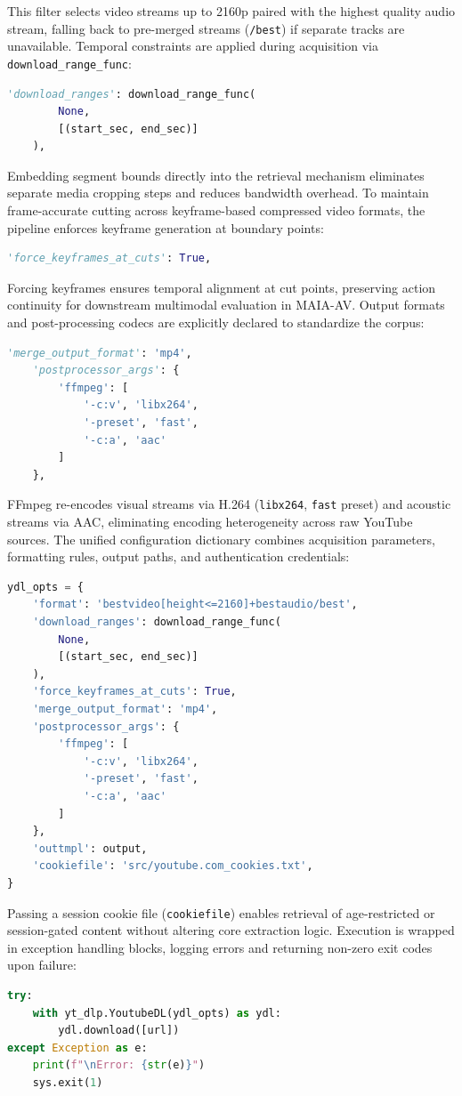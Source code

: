 This filter selects video streams up to 2160p paired with the highest quality audio stream, falling back to pre-merged streams (\texttt{/best}) if separate tracks are unavailable.
Temporal constraints are applied during acquisition via \texttt{download\_range\_func}:
\begin{lstlisting}[language=Python, xleftmargin=2em]
    'download_ranges': download_range_func(
        None,
        [(start_sec, end_sec)]
    ),
\end{lstlisting}
Embedding segment bounds directly into the retrieval mechanism eliminates separate media cropping steps and reduces bandwidth overhead.
To maintain frame-accurate cutting across keyframe-based compressed video formats, the pipeline enforces keyframe generation at boundary points:
\begin{lstlisting}[language=Python, xleftmargin=2em]
    'force_keyframes_at_cuts': True,
\end{lstlisting}
Forcing keyframes ensures temporal alignment at cut points, preserving action continuity for downstream multimodal evaluation in MAIA-AV.
Output formats and post-processing codecs are explicitly declared to standardize the corpus:
\begin{lstlisting}[language=Python, xleftmargin=2em]
    'merge_output_format': 'mp4',
    'postprocessor_args': {
        'ffmpeg': [
            '-c:v', 'libx264',
            '-preset', 'fast',
            '-c:a', 'aac'
        ]
    },
\end{lstlisting}
FFmpeg re-encodes visual streams via H.264 (\texttt{libx264}, \texttt{fast} preset) and acoustic streams via AAC, eliminating encoding heterogeneity across raw YouTube sources.
The unified configuration dictionary combines acquisition parameters, formatting rules, output paths, and authentication credentials:
\begin{lstlisting}[language=Python, xleftmargin=2em]
ydl_opts = {
    'format': 'bestvideo[height<=2160]+bestaudio/best',
    'download_ranges': download_range_func(
        None,
        [(start_sec, end_sec)]
    ),
    'force_keyframes_at_cuts': True,
    'merge_output_format': 'mp4',
    'postprocessor_args': {
        'ffmpeg': [
            '-c:v', 'libx264',
            '-preset', 'fast',
            '-c:a', 'aac'
        ]
    },
    'outtmpl': output,
    'cookiefile': 'src/youtube.com_cookies.txt',
}
\end{lstlisting}
Passing a session cookie file (\texttt{cookiefile}) enables retrieval of age-restricted or session-gated content without altering core extraction logic.
Execution is wrapped in exception handling blocks, logging errors and returning non-zero exit codes upon failure:
\begin{lstlisting}[language=Python, xleftmargin=2em]
try:
    with yt_dlp.YoutubeDL(ydl_opts) as ydl:
        ydl.download([url])
except Exception as e:
    print(f"\nError: {str(e)}")
    sys.exit(1)
\end{lstlisting}

